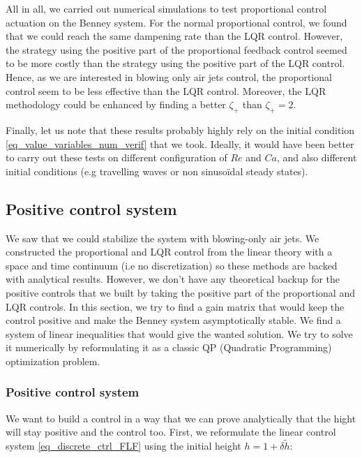 \documentclass[12pt]{article}
\begin{document}
\vspace{0.5cm}

All in all, we carried out numerical simulations to test proportional control actuation on the Benney system.
For the normal proportional control, we found that we could reach the same dampening rate than the LQR control.
However, the strategy using the positive part of the proportional feedback control seemed to be more costly
than the strategy using the positive part of the LQR control. Hence, as we are interested in blowing only air jets control, 
the proportional control seem to be less effective than the LQR control. Moreover, the LQR methodology could be enhanced by
finding a better $\zeta_+$ than $\zeta_+ = 2$. 

Finally, let us note that these results probably highly rely on the initial condition \eqref{eq_value_variables_num_verif}
that we took. Ideally, it would have been better to carry out these tests on different configuration of 
$Re$ and $Ca$, and also different initial conditions (e.g travelling waves or non sinusoïdal steady states).  

\subsection{Positive control system}
We saw that we could stabilize the system with blowing-only air jets. We constructed the
proportional and LQR control from the linear theory with a space and time continuum 
(i.e no discretization) so these methods are backed with analytical results. However,
we don't have any theoretical backup for the positive controls that we built by taking 
the positive part of the proportional and LQR controls. In this section, we try to find a 
gain matrix that would keep the control positive and make the Benney system asymptotically 
stable. We find a system of linear inequalities that would give the wanted solution. We try 
to solve it numerically by reformulating it as a classic QP (Quadratic Programming) optimization
problem.


\subsubsection{Positive control system}

We want to build a control in a way that we can prove analytically that the hight will stay positive and the control too. First, we reformulate the linear control system \eqref{eq_discrete_ctrl_FLF} using the initial height $h = 1 + \delta \tilde{h}$:
\end{document}
